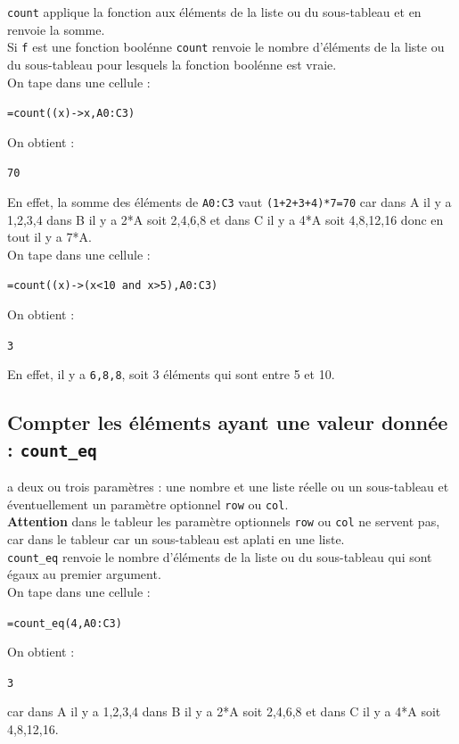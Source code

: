 \documentclass[a4paper,11pt]{book}
\begin{document}
{\tt count} applique la fonction aux \'el\'ements de la 
liste ou du sous-tableau et en renvoie la somme.\\
Si {\tt f} est une fonction bool\'enne {\tt count} renvoie le nombre 
d'\'el\'ements de la liste ou du sous-tableau pour lesquels la fonction 
bool\'enne est vraie.\\
On tape dans une cellule :
\begin{center}{\tt =count((x)->x,A0:C3)}\end{center}
On obtient :
\begin{center}{\tt  70}\end{center}
En effet, la somme des \'el\'ements de {\tt A0:C3} vaut {\tt (1+2+3+4)*7=70}
car dans A il y a 1,2,3,4 dans B il y a 2*A soit 2,4,6,8 et dans C il y a 4*A 
soit 4,8,12,16 donc en tout il y a 7*A.\\
On tape dans une cellule :
\begin{center}{\tt =count((x)->(x<10 and x>5),A0:C3)}\end{center}
On obtient :
\begin{center}{\tt  3}\end{center}
En effet, il y a {\tt 6,8,8}, soit 3 \'el\'ements qui sont entre 5 et 10.
\subsection{Compter les \'el\'ements ayant une valeur donn\'ee : {\tt count\_eq}}
 a deux ou trois param\`etres : une nombre et une liste
r\'eelle ou un sous-tableau et \'eventuellement un param\`etre 
optionnel {\tt row} ou {\tt col}.\\
{\bf Attention} dans le tableur les param\`etre optionnels {\tt row} ou 
{\tt col} ne servent pas, car dans le tableur car un sous-tableau est aplati en
 une liste.\\
{\tt count\_eq} renvoie le nombre d'\'el\'ements de la liste ou du sous-tableau
qui sont \'egaux au premier argument.\\
On tape dans une cellule :
\begin{center}{\tt =count\_eq(4,A0:C3)}\end{center}
On obtient :
\begin{center}{\tt  3}\end{center}
car dans A il y a 1,2,3,4 dans B il y a 2*A soit 2,4,6,8 et dans C il y a 4*A 
soit 4,8,12,16.
\end{document}
